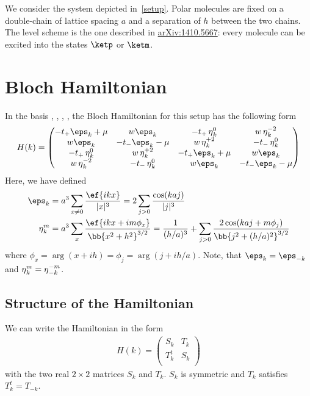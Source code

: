 We consider the system depicted in~\cref{setup}.
Polar molecules are fixed on a double-chain of lattice spacing $a$ and a separation of $h$ between the two chains.
The level scheme is the one described in \href{http://arxiv.org/abs/1410.5667}{arXiv:1410.5667}: every molecule can be excited into the states $\ketp$ or $\ketm$.

\section{Bloch Hamiltonian}
In the basis \upp, \upm, \dnp, \dnm, the Bloch Hamiltonian for this setup has the following form
\begin{align}
    H(k) =
    \begin{pmatrix}
        -t_+ \eps_k + \mu & w \eps_k & -t_+ \et^0_k & w \et^{-2}_k \\
        w \eps_k & -t_- \eps_k - \mu & w \et^{+2}_k & -t_- \et^0_k \\
        -t_+ \et^0_{k} & w \et^{+2}_{k}  & -t_+ \eps_k + \mu & w \eps_k \\
        w \et^{-2}_{k} & -t_- \et^0_{k} & w \eps_k & -t_- \eps_k - \mu
    \end{pmatrix}
\end{align}
Here, we have defined
\begin{align}
    \eps_k &= a^3 \sum_{x\ne 0} \frac{\ef{i k x}}{|x|^3} = 2 \sum_{j>0} \frac{\cos(k a j)}{|j|^3} \\
    \et^m_k &= a^3 \sum_{x} \frac{\ef{i k x + i m \phi_x}}{\bb{x^2 + h^2}^{3/2}}
    = \frac{1}{(h/a)^3} + \sum_{j>0} \frac{2\cos(ka j+m\phi_j)}{\bb{j^2+(h/a)^2}^{3/2}}
\end{align}
where $\phi_x = \arg(x+ i h)=\phi_j=\arg(j+ i h/a)$. Note, that $\eps_k=\eps_{-k}$ and $\operatorname{\eta}^m_k=\operatorname{\eta}^{-m}_{-k}$.

\subsection{Structure of the Hamiltonian}
We can write the Hamiltonian in the form
\begin{align}
    H(k) =
    \begin{pmatrix}
        S_k & T_k \\
        T_k^t & S_k \\
    \end{pmatrix}
\end{align}
with the two real $2\times2$ matrices $S_k$ and $T_k$.
$S_k$ is symmetric and $T_k$ satisfies $T_k^t=T_{-k}$.


